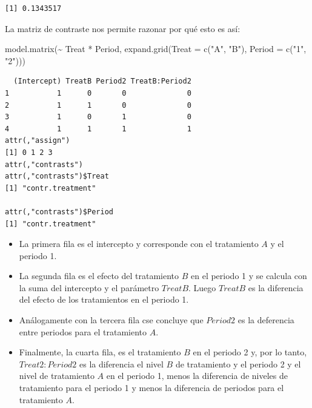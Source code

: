\documentclass[
  12pt,
  a4paper,
  extrafontsizes,
  onecolumn,
  openright,
  table]{memoir}
\newenvironment{Shaded}{\begin{snugshade}}{\end{snugshade}}
\newcommand{\AttributeTok}[1]{\textcolor[rgb]{0.40,0.45,0.13}{#1}}
\newcommand{\FunctionTok}[1]{\textcolor[rgb]{0.28,0.35,0.67}{#1}}
\newcommand{\NormalTok}[1]{\textcolor[rgb]{0.00,0.23,0.31}{#1}}
\newcommand{\SpecialCharTok}[1]{\textcolor[rgb]{0.37,0.37,0.37}{#1}}
\newcommand{\StringTok}[1]{\textcolor[rgb]{0.13,0.47,0.30}{#1}}
\providecommand{\tightlist}{%
  \setlength{\itemsep}{0pt}\setlength{\parskip}{0pt}}\usepackage{longtable,booktabs,array}
\begin{document}
\begin{verbatim}
[1] 0.1343517
\end{verbatim}

\normalsize

La matriz de contraste nos permite razonar por qué esto es así:

\scriptsize

\begin{Shaded}
\begin{Highlighting}[]
\FunctionTok{model.matrix}\NormalTok{(}\SpecialCharTok{\textasciitilde{}}\NormalTok{ Treat }\SpecialCharTok{*}\NormalTok{ Period, }\FunctionTok{expand.grid}\NormalTok{(}\AttributeTok{Treat =} \FunctionTok{c}\NormalTok{(}\StringTok{"A"}\NormalTok{, }\StringTok{"B"}\NormalTok{), }\AttributeTok{Period =} \FunctionTok{c}\NormalTok{(}\StringTok{"1"}\NormalTok{, }\StringTok{"2"}\NormalTok{)))}
\end{Highlighting}
\end{Shaded}

\begin{verbatim}
  (Intercept) TreatB Period2 TreatB:Period2
1           1      0       0              0
2           1      1       0              0
3           1      0       1              0
4           1      1       1              1
attr(,"assign")
[1] 0 1 2 3
attr(,"contrasts")
attr(,"contrasts")$Treat
[1] "contr.treatment"

attr(,"contrasts")$Period
[1] "contr.treatment"
\end{verbatim}

\normalsize

\begin{itemize}
\tightlist
\item
  La primera fila es el intercepto y corresponde con el tratamiento
  \(A\) y el periodo 1.
\item
  La segunda fila es el efecto del tratamiento \(B\) en el periodo 1 y
  se calcula con la suma del intercepto y el parámetro \(TreatB\). Luego
  \(TreatB\) es la diferencia del efecto de los tratamientos en el
  periodo 1.
\item
  Análogamente con la tercera fila cse concluye que \(Period2\) es la
  deferencia entre periodos para el tratamiento \(A\).
\item
  Finalmente, la cuarta fila, es el tratamiento \(B\) en el periodo 2 y,
  por lo tanto, \(Treat2:Period2\) es la diferencia el nivel \(B\) de
  tratamiento y el periodo 2 y el nivel de tratamiento \(A\) en el
  periodo 1, menos la diferencia de niveles de tratamiento para el
  periodo 1 y menos la diferencia de periodos para el tratamiento \(A\).
\end{itemize}
\end{document}
